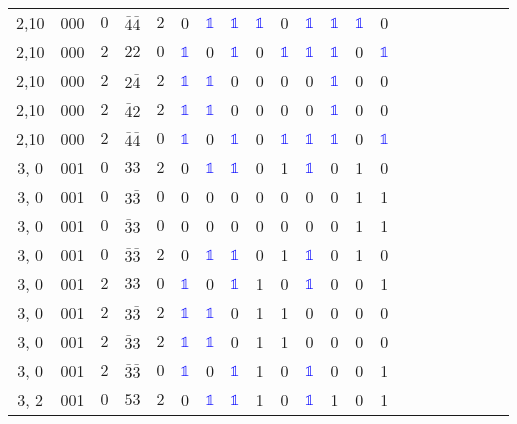 \begin{longtable*}{c| cccccccccccccccccccc }
2,10& 000& $0$& $\bar{4}\bar{4}$& $2$& 0& \textcolor{blue}{$\mathds{1}$}& \textcolor{blue}{$\mathds{1}$}& \textcolor{blue}{$\mathds{1}$}& 0& \textcolor{blue}{$\mathds{1}$}& \textcolor{blue}{$\mathds{1}$}& \textcolor{blue}{$\mathds{1}$}& 0\\
2,10& 000& $2$& $22$& $0$& \textcolor{blue}{$\mathds{1}$}& 0& \textcolor{blue}{$\mathds{1}$}& 0& \textcolor{blue}{$\mathds{1}$}& \textcolor{blue}{$\mathds{1}$}& \textcolor{blue}{$\mathds{1}$}& 0& \textcolor{blue}{$\mathds{1}$}\\
2,10& 000& $2$& $2\bar{4}$& $2$& \textcolor{blue}{$\mathds{1}$}& \textcolor{blue}{$\mathds{1}$}& 0& 0& 0& 0& \textcolor{blue}{$\mathds{1}$}& 0& 0\\
2,10& 000& $2$& $\bar{4}2$& $2$& \textcolor{blue}{$\mathds{1}$}& \textcolor{blue}{$\mathds{1}$}& 0& 0& 0& 0& \textcolor{blue}{$\mathds{1}$}& 0& 0\\
2,10& 000& $2$& $\bar{4}\bar{4}$& $0$& \textcolor{blue}{$\mathds{1}$}& 0& \textcolor{blue}{$\mathds{1}$}& 0& \textcolor{blue}{$\mathds{1}$}& \textcolor{blue}{$\mathds{1}$}& \textcolor{blue}{$\mathds{1}$}& 0& \textcolor{blue}{$\mathds{1}$}\\
3, 0& 001& $0$& $33$& $2$& 0& \textcolor{blue}{$\mathds{1}$}& \textcolor{blue}{$\mathds{1}$}& 0& 1& \textcolor{blue}{$\mathds{1}$}& 0& 1& 0\\
3, 0& 001& $0$& $3\bar{3}$& $0$& 0& 0& 0& 0& 0& 0& 0& 1& 1\\
3, 0& 001& $0$& $\bar{3}3$& $0$& 0& 0& 0& 0& 0& 0& 0& 1& 1\\
3, 0& 001& $0$& $\bar{3}\bar{3}$& $2$& 0& \textcolor{blue}{$\mathds{1}$}& \textcolor{blue}{$\mathds{1}$}& 0& 1& \textcolor{blue}{$\mathds{1}$}& 0& 1& 0\\
3, 0& 001& $2$& $33$& $0$& \textcolor{blue}{$\mathds{1}$}& 0& \textcolor{blue}{$\mathds{1}$}& 1& 0& \textcolor{blue}{$\mathds{1}$}& 0& 0& 1\\
3, 0& 001& $2$& $3\bar{3}$& $2$& \textcolor{blue}{$\mathds{1}$}& \textcolor{blue}{$\mathds{1}$}& 0& 1& 1& 0& 0& 0& 0\\
3, 0& 001& $2$& $\bar{3}3$& $2$& \textcolor{blue}{$\mathds{1}$}& \textcolor{blue}{$\mathds{1}$}& 0& 1& 1& 0& 0& 0& 0\\
3, 0& 001& $2$& $\bar{3}\bar{3}$& $0$& \textcolor{blue}{$\mathds{1}$}& 0& \textcolor{blue}{$\mathds{1}$}& 1& 0& \textcolor{blue}{$\mathds{1}$}& 0& 0& 1\\
3, 2& 001& $0$& $53$& $2$& 0& \textcolor{blue}{$\mathds{1}$}& \textcolor{blue}{$\mathds{1}$}& 1& 0& \textcolor{blue}{$\mathds{1}$}& 1& 0& 1\\

\end{longtable*}

